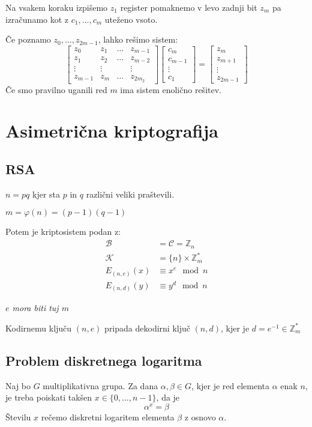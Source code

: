 \begin{multicols}{5}
Na vsakem koraku izpišemo $z_1$ register pomaknemo v levo zadnji bit $z_m$ pa 
izračunamo kot z $c_1, \dots, c_m$ uteženo vsoto.

Če poznamo $z_0, \dots, z_{2m-1}$, lahko rešimo sistem:
\[
\begin{bmatrix}
	z_0 & z_1 & \dots & z_{m-1} \\
	z_1 & z_2 & \dots & z_{m-2} \\
	\vdots & \vdots & & \vdots \\
	z_{m-1} & z_{m} & \dots & z_{2m_2} 
\end{bmatrix}
\begin{bmatrix}
	c_m \\
	c_{m-1} \\
	\vdots \\
	c_1
\end{bmatrix}
=
\begin{bmatrix}
	z_m \\
	z_{m+1} \\
	\vdots \\
	z_{2m-1}
\end{bmatrix}
\]
Če smo pravilno uganili red $m$ ima sistem enolično rešitev.

\section*{Asimetrična kriptografija}
\subsection*{RSA}
$n = pq$ kjer sta $p$ in $q$ različni veliki praštevili.

$m = \varphi(n) = (p-1)(q-1)$

Potem je kriptosistem podan z:
\begin{align*}
	\mathcal{B} &= \mathcal{C} = \mathbb{Z}_n \\
	\mathcal{K} &= \{n\} \times \mathbb{Z}_m^* \\
	E_{(n,e)}(x) &\equiv x^e \mod n \\
	E_{(n,d)}(y) &\equiv y^d \mod n
\end{align*}

\textit{$e$ mora biti tuj $m$}

Kodirnemu ključu $(n, e)$ pripada dekodirni ključ $(n, d)$, kjer je $d = e^{-1} \in \mathbb{Z}_m^*$

\subsection*{Problem diskretnega logaritma}
Naj bo $G$ multiplikativna grupa. Za dana $\alpha, \beta \in G$, kjer je red elementa $\alpha$ enak $n$, 
je treba poiskati takšen $x \in \{0, \dots, n-1\}$, da je
\[ \alpha^x = \beta\]
Številu $x$ rečemo diskretni logaritem elementa $\beta$ z osnovo $\alpha$.


\end{multicols}
